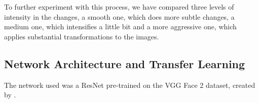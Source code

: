 To further experiment with this process, we have compared three levels of intensity in the changes, a smooth one, which does more subtle changes, a medium one, which intensifies a little bit and a more aggressive one, which applies substantial transformations to the images.

\subsection{Network Architecture and Transfer Learning}

The network used was a ResNet pre-trained on the VGG Face 2 dataset, created by \cite{ParkhiVZ15}.




